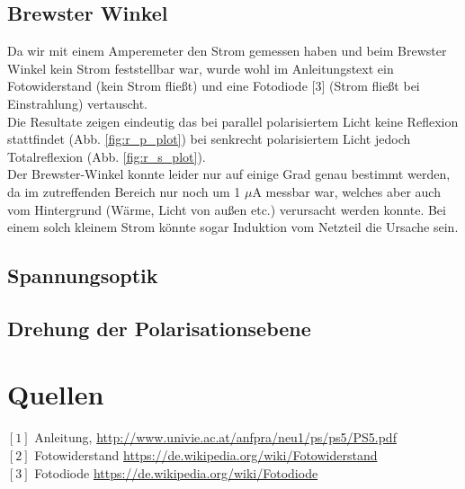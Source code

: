 \documentclass[12pt,a4paper]{article}
\begin{document}
\begin{multicols}{2}
\subsection{Brewster Winkel}
Da wir mit einem Amperemeter den Strom gemessen haben und beim Brewster Winkel kein Strom feststellbar war, wurde wohl im Anleitungstext ein Fotowiderstand (kein Strom fließt) und eine Fotodiode [3] (Strom fließt bei Einstrahlung) vertauscht. \\
Die Resultate zeigen eindeutig das bei parallel polarisiertem Licht keine Reflexion stattfindet  (Abb. \ref{fig:r_p_plot}) bei senkrecht polarisiertem Licht jedoch Totalreflexion (Abb. \ref{fig:r_s_plot}). \\
Der Brewster-Winkel konnte leider nur auf einige Grad genau bestimmt werden, da im zutreffenden Bereich nur noch um 1 $\mu$A messbar war, welches aber auch vom Hintergrund (Wärme, Licht von außen etc.) verursacht werden konnte. Bei einem solch kleinem Strom könnte sogar Induktion vom Netzteil die Ursache sein.


\subsection{Spannungsoptik}




\subsection{Drehung der Polarisationsebene}




\section{Quellen}
$[1]$ Anleitung, \url{http://www.univie.ac.at/anfpra/neu1/ps/ps5/PS5.pdf}\\
$[2]$ Fotowiderstand \url{https://de.wikipedia.org/wiki/Fotowiderstand}\\
$[3]$ Fotodiode \url{https://de.wikipedia.org/wiki/Fotodiode}\\
\end{multicols}
\end{document}
